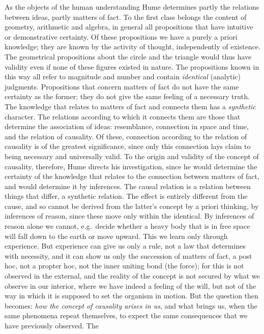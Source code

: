 As the objects of the human understanding Hume determines partly the
relations between ideas, partly matters of fact. To the first class
belongs the content of geometry, arithmetic and algebra, in general all
propositions that have intuitive or demonstrative certainty. Of these
propositions we have a purely a priori knowledge; they are known by the
activity of thought, independently of existence. The geometrical
propositions about the circle and the triangle would thus have validity
even if none of these figures existed in nature. The propositions known
in this way all refer to magnitude and number and contain
\emph{identical} (analytic) judgments. Propositions that concern matters
of fact do not have the same certainty as the former; they do not give
the same feeling of a necessary truth. The knowledge that relates to
matters of fact and connects them has a \emph{synthetic} character. The
relations according to which it connects them are those that determine
the association of ideas: resemblance, connection in space and time,
and the relation of causality. Of these, connection according to the
relation of causality is of the greatest significance, since only this
connection lays claim to being necessary and universally valid. To the
origin and validity of the concept of causality, therefore, Hume
directs his investigation, since he would determine the certainty of
the knowledge that relates to the connection between matters of fact,
and would determine it by inferences. The causal relation is a relation
between things that differ, a synthetic relation. The effect is
entirely different from the cause, and so cannot be derived from the
latter's concept by a priori thinking, by inferences of reason, since
these move only within the identical. By inferences of reason alone we
cannot, e.g.\ decide whether a heavy body that is in free space will
fall down to the earth or move upward. This we learn only through
experience. But experience can give us only a rule, not a law that
determines with necessity, and it can show us only the succession of
matters of fact, a post hoc, not a propter hoc, not the inner uniting
bond (the force); for this is not observed in the external, and the
reality of the concept is not secured by what we observe in our
interior, where we have indeed a feeling of the will, but not of the
way in which it is supposed to set the organism in motion. But the
question then becomes: \emph{how the concept of causality arises in
us}, and what brings us, when the same phenomena repeat themselves, to
expect the same consequences that we have previously observed. The

